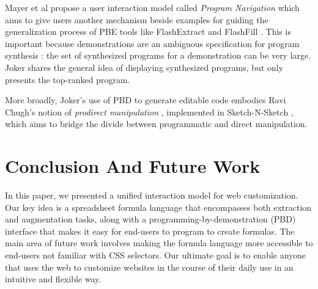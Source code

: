 \documentclass[sigconf,10pt]{acmart}
\begin{document}
Mayer et al propose a user interaction model called \emph{Program
Navigation} \citep{mayer2015} which aims to give users another mechanism
beside examples for guiding the generalization process of PBE tools like
FlashExtract \citep{le2014} and FlashFill \citep{harris}. This is
important because demonstrations are an ambiguous specification for
program synthesis \citep{peleg2018}: the set of synthesized programs for
a demonstration can be very large. Joker shares the general idea of
displaying synthesized programs, but only presents the top-ranked
program.

More broadly, Joker's use of PBD to generate editable code embodies Ravi
Chugh's notion of \emph{prodirect manipulation} \citep{chugh2016a},
implemented in Sketch-N-Sketch \citep{chugh2016}, which aims to bridge
the divide between programmatic and direct manipulation.

\hypertarget{sec:conclusion}{%
\section{Conclusion And Future Work}\label{sec:conclusion}}

In this paper, we presented a unified interaction model for web
customization. Our key idea is a spreadsheet formula language that
encompasses both extraction and augmentation tasks, along with a
programming-by-demonstration (PBD) interface that makes it easy for
end-users to program to create formulas. The main area of future work
involves making the formula language more accessible to end-users not
familiar with CSS selectors. Our ultimate goal is to enable anyone that
uses the web to customize websites in the course of their daily use in
an intuitive and flexible way.




\end{document}
